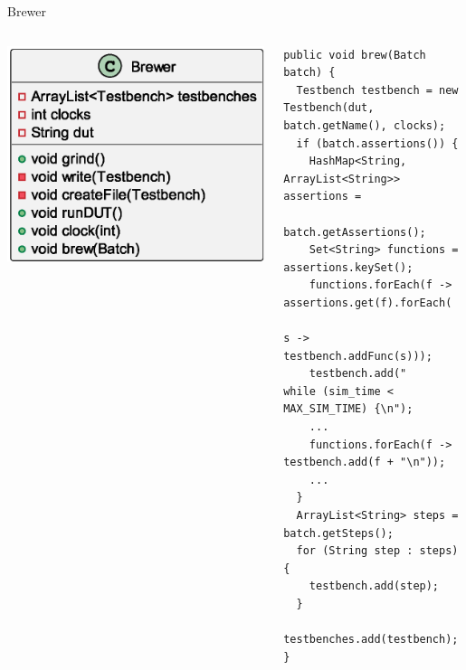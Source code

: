 \documentclass[aspectratio=169, handout]{beamer}
\begin{document}
\begin{frame}[containsverbatim]{Brewer}
    \begin{columns}[T]
        \begin{column}{.2\textwidth}
            \includegraphics[width=\columnwidth]{out/plantuml/BrewerClass/BrewerClass.eps}
        \end{column}
        \begin{column}{.8\textwidth}
            \begin{verbatim}
public void brew(Batch batch) {
  Testbench testbench = new Testbench(dut, batch.getName(), clocks);
  if (batch.assertions()) {
    HashMap<String, ArrayList<String>> assertions = 
                                        batch.getAssertions();
    Set<String> functions = assertions.keySet();
    functions.forEach(f -> assertions.get(f).forEach(
                                        s -> testbench.addFunc(s)));
    testbench.add("    while (sim_time < MAX_SIM_TIME) {\n");
    ...
    functions.forEach(f -> testbench.add(f + "\n"));
    ...
  }
  ArrayList<String> steps = batch.getSteps();
  for (String step : steps) {
    testbench.add(step);
  }
  testbenches.add(testbench);
}
            \end{verbatim}
        \end{column}
    \end{columns}
\end{frame}
\end{document}
